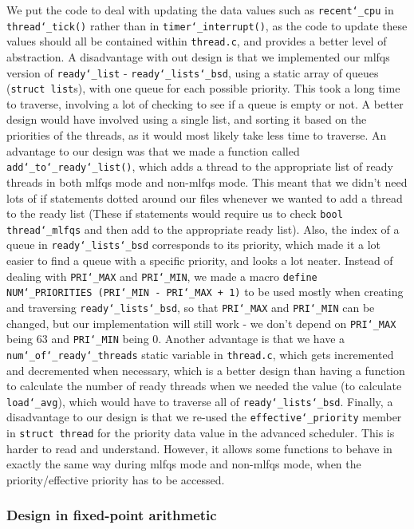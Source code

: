 \documentclass{article}
\renewcommand{\_}{\char`_}
\begin{document}
We put the code to deal with updating the data values such as \texttt{recent\_cpu} in \texttt{thread\_tick()} rather than in \texttt{timer\_interrupt()}, as the code to update these values should all be contained within \texttt{thread.c}, and provides a better level of abstraction. A disadvantage with out design is that we implemented our mlfqs version of \texttt{ready\_list} - \texttt{ready\_lists\_bsd}, using a static array of queues (\texttt{struct list}s), with one queue for each possible priority. This took a long time to traverse, involving a lot of checking to see if a queue is empty or not. A better design would have involved using a single list, and sorting it based on the priorities of the threads, as it would most likely take less time to traverse. An advantage to our design was that we made a function called \texttt{add\_to\_ready\_list()}, which adds a thread to the appropriate list of ready threads in both mlfqs mode and non-mlfqs mode. This meant that we didn't need lots of if statements dotted around our files whenever we wanted to add a thread to the ready list (These if statements would require us to check \texttt{bool thread\_mlfqs} and then add to the appropriate ready list). Also, the index of a queue in \texttt{ready\_lists\_bsd} corresponds to its priority, which made it a lot easier to find a queue with a specific priority, and looks a lot neater. Instead of dealing with \texttt{PRI\_MAX} and \texttt{PRI\_MIN}, we made a macro \texttt{define NUM\_PRIORITIES (PRI\_MIN - PRI\_MAX + 1)} to be used mostly when creating and traversing \texttt{ready\_lists\_bsd}, so that \texttt{PRI\_MAX} and \texttt{PRI\_MIN} can be changed, but our implementation will still work - we don't depend on \texttt{PRI\_MAX} being 63 and \texttt{PRI\_MIN} being 0. Another advantage is that we have a \texttt{num\_of\_ready\_threads} static variable in \texttt{thread.c}, which gets incremented and decremented when necessary, which is a better design than having a function to calculate the number of ready threads when we needed the value (to calculate \texttt{load\_avg}), which would have to traverse all of \texttt{ready\_lists\_bsd}. Finally, a disadvantage to our design is that we re-used the \texttt{effective\_priority} member in \texttt{struct thread} for the priority data value in the advanced scheduler. This is harder to read and understand. However, it allows some functions to behave in exactly the same way during mlfqs mode and non-mlfqs mode, when the priority/effective priority has to be accessed.

\subsubsection{Design in fixed-point arithmetic}
\end{document}
